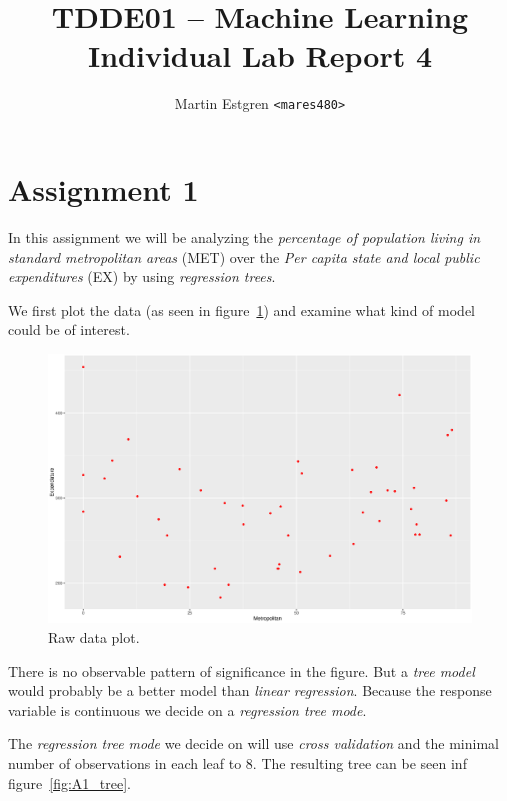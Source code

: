 \documentclass[a4paper,12pt]{article}
\title{TDDE01 -- Machine Learning \\
Individual Lab Report 4}
\author{Martin Estgren \texttt{<mares480>}}
\begin{document}
    \maketitle %
    \section{Assignment 1}
    In this assignment we will be analyzing the \textit{percentage of population living in standard metropolitan areas} (MET) over the \textit{Per capita state and local public expenditures} (EX) by using \textit{regression trees}. 

    We first plot the data (as seen in figure~\ref{fig:A1_data}) and examine what kind of model could be of interest. 

    \begin{figure}[H]
    \centering
    \includegraphics[width=\textwidth]{figures/A1_data}  
    \caption{Raw data plot. \label{fig:A1_data}}
    \end{figure}


    There is no observable pattern of significance in the figure. But a \textit{tree model} would probably be a better model than \textit{linear regression}. Because the response variable is continuous we decide on a \textit{regression tree mode}. 

    The \textit{regression tree mode} we decide on will use \textit{cross validation} and the minimal number of observations in each leaf to 8. The resulting tree can be seen inf figure~\ref{fig:A1_tree}.
\end{document}
